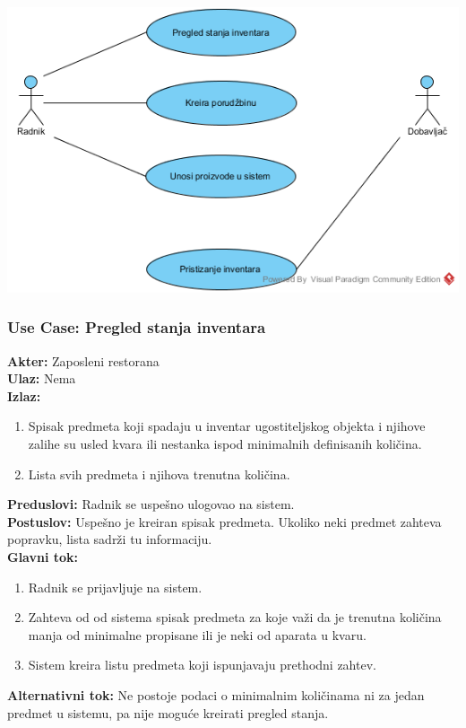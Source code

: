 \documentclass{article}
\begin{document}
\includegraphics[width=\textwidth]{SU_2_pregled_inventara.png}
\subsubsection{\textbf{Use Case}: Pregled stanja inventara}
\textbf{Akter:} Zaposleni restorana\\
\textbf{Ulaz:} Nema\\
\textbf{Izlaz:} 
\begin{enumerate}
	\item Spisak predmeta koji spadaju u inventar ugostiteljskog objekta i njihove zalihe su usled kvara ili nestanka ispod minimalnih definisanih količina.
	\item Lista svih predmeta i njihova trenutna količina.
\end{enumerate} 
\textbf{Preduslovi:} Radnik se uspešno ulogovao na sistem.\\
\textbf{Postuslov:} Uspešno je kreiran spisak predmeta. Ukoliko neki predmet zahteva popravku, lista sadrži tu informaciju.\\
\textbf{Glavni tok:} 
\begin{enumerate}
	\item Radnik se prijavljuje na sistem.
	\item Zahteva od  od sistema spisak predmeta za koje važi da je trenutna količina manja od minimalne propisane ili je neki od aparata u kvaru.
	\item Sistem kreira listu predmeta koji ispunjavaju prethodni zahtev.
\end{enumerate}
\textbf{Alternativni tok:} Ne postoje podaci o minimalnim količinama ni za jedan predmet u sistemu, pa nije moguće kreirati pregled stanja.\\
\end{document}
